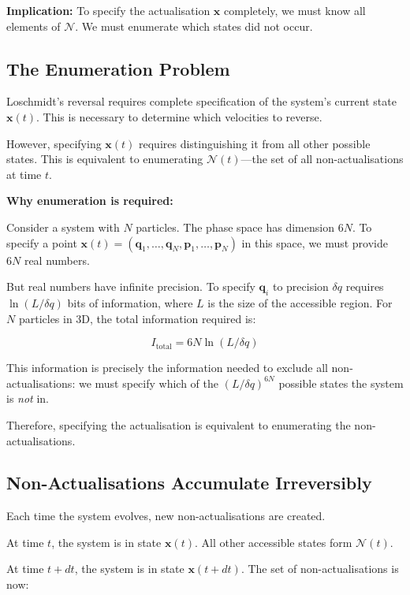 \documentclass[twocolumn,10pt]{article}
\theoremstyle{definition}
\theoremstyle{remark}
\begin{document}
\textbf{Implication:} To specify the actualisation $\mathbf{x}$ completely, we must know all elements of $\mathcal{N}$. We must enumerate which states did not occur.

\subsection{The Enumeration Problem}

Loschmidt's reversal requires complete specification of the system's current state $\mathbf{x}(t)$. This is necessary to determine which velocities to reverse.

However, specifying $\mathbf{x}(t)$ requires distinguishing it from all other possible states. This is equivalent to enumerating $\mathcal{N}(t)$—the set of all non-actualisations at time $t$.

\textbf{Why enumeration is required:}

Consider a system with $N$ particles. The phase space has dimension $6N$. To specify a point $\mathbf{x}(t) = (\mathbf{q}_1, \ldots, \mathbf{q}_N, \mathbf{p}_1, \ldots, \mathbf{p}_N)$ in this space, we must provide $6N$ real numbers.

But real numbers have infinite precision. To specify $\mathbf{q}_i$ to precision $\delta q$ requires $\ln(L/\delta q)$ bits of information, where $L$ is the size of the accessible region. For $N$ particles in 3D, the total information required is:

$$
I_{\text{total}} = 6N \ln(L/\delta q)
$$

This information is precisely the information needed to exclude all non-actualisations: we must specify which of the $(L/\delta q)^{6N}$ possible states the system is \textit{not} in.

Therefore, specifying the actualisation is equivalent to enumerating the non-actualisations.

\subsection{Non-Actualisations Accumulate Irreversibly}

Each time the system evolves, new non-actualisations are created.

At time $t$, the system is in state $\mathbf{x}(t)$. All other accessible states form $\mathcal{N}(t)$.

At time $t + dt$, the system is in state $\mathbf{x}(t + dt)$. The set of non-actualisations is now:
\end{document}
